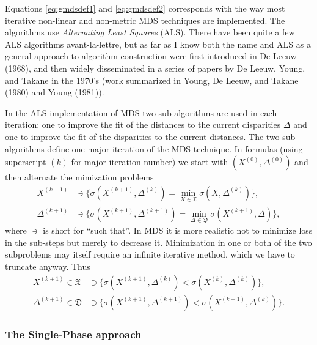 \documentclass[
  12pt,
]{article}
\begin{document}
Equations \eqref{eq:gmdsdef1} and \eqref{eq:gmdsdef2} corresponds with the way most iterative non-linear and non-metric MDS
techniques are implemented. The algorithms use \emph{Alternating Least Squares} (ALS).
There have been quite a few ALS algorithms avant-la-lettre, but as far as I know both the name
and ALS as a general approach to algorithm construction were first introduced in De Leeuw (1968), and then widely disseminated in a series of papers by
De Leeuw, Young, and Takane in the 1970's (work summarized in Young, De Leeuw, and Takane (1980) and Young (1981)).

In the ALS implementation of MDS two sub-algorithms are used in each iteration: one to improve the fit of the distances to the current disparities
\(\Delta\) and one to improve the fit of the disparities to the current distances.
The two sub-algorithms define one major iteration of the MDS technique. In formulas
(using superscript \((k)\) for major iteration number) we start with \((X^{(0)},\Delta^{(0)})\)
and then alternate the mimization problems
\begin{subequations}
\begin{align}
X^{(k+1)}&\ni\{\sigma(X^{(k+1)},\Delta^{(k)})=\min_{X\in\mathfrak{X}}\sigma(X,\Delta^{(k)})\},\\
\Delta^{(k+1)}&\ni\{\sigma(X^{(k+1)},\Delta^{(k+1)})=\min_{\Delta\in\mathfrak{D}}\sigma(X^{(k+1)},\Delta)\},
\end{align}
\end{subequations}
where \(\ni\) is short for ``such that''.
In MDS it is more realistic not to minimize loss in the sub-steps but merely to decrease it. Minimization in one or both of the two subproblems may itself require an infinite iterative method, which we have to truncate anyway. Thus
\begin{subequations}
\begin{align}
X^{(k+1)}\in\mathfrak{X}&\ni\{\sigma(X^{(k+1)},\Delta^{(k)})<\sigma(X^{(k)},\Delta^{(k)})\},\\
\Delta^{(k+1)}\in\mathfrak{D}&\ni\{\sigma(X^{(k+1)},\Delta^{(k+1)})<\sigma(X^{(k+1)},\Delta^{(k)})\}.
\end{align}
\end{subequations}

\subsubsection{The Single-Phase approach}\label{the-single-phase-approach}
\end{document}
